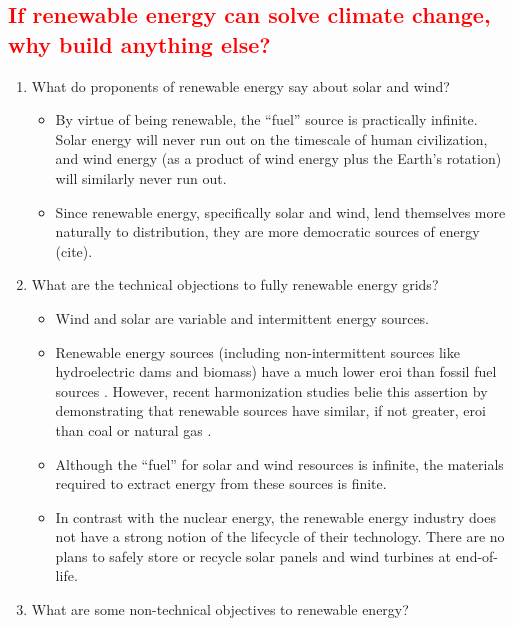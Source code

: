\subsection{\textcolor{red}{If renewable energy can solve climate change, why
build anything else?}}

\begin{enumerate}
    \item What do proponents of renewable energy say about solar and wind?
    \begin{itemize}
        \item By virtue of being renewable, the ``fuel'' source is practically
        infinite. Solar energy will never run out on the timescale of human
        civilization, and wind energy (as a product of wind energy plus the
        Earth's rotation) will similarly never run out.
        \item Since renewable energy, specifically solar and wind, lend
        themselves more naturally to distribution, they are more democratic
        sources of energy (cite).
    \end{itemize}
    \item What are the technical objections to fully renewable energy grids?
    \begin{itemize}
        \item Wind and solar are variable and intermittent energy sources.
        \item Renewable energy sources (including non-intermittent sources like
        hydroelectric dams and biomass) have a much lower \ac{eroi} than fossil
        fuel sources \cite{hall_eroi_2014,weisbach_energy_2013}. However, recent
        harmonization studies belie this assertion by demonstrating that
        renewable sources have similar, if not greater, \ac{eroi} than coal or
        natural gas \cite{murphy_energy_2022}.
        \item Although the ``fuel'' for solar and wind resources is infinite,
        the materials required to extract energy from these sources is finite.
        \item In contrast with the nuclear energy, the renewable energy industry
        does not have a strong notion of the lifecycle of their technology. There
        are no plans to safely store or recycle solar panels and wind turbines at
        end-of-life.
    \end{itemize}
    \item What are some non-technical objectives to renewable energy?
    \begin{itemize}

\end{itemize}
\end{enumerate}
